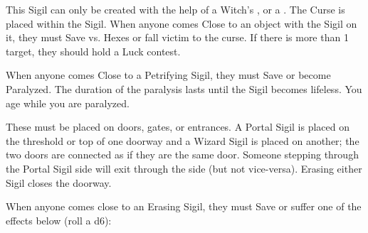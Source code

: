 {

\mybold{\COST 10\AU}



This Sigil can only be created with the help of a Witch's , or a .  The Curse is placed within the Sigil.  When anyone comes Close to an object with the Sigil on it, they must Save vs. Hexes or fall victim to the curse.  If there is more than 1 target, they should hold a Luck contest. 


When anyone comes Close to a Petrifying Sigil, they must Save or become Paralyzed.  The duration of the paralysis lasts until the Sigil becomes lifeless. You age while you are paralyzed.


These must be placed on doors, gates, or entrances.  A Portal Sigil is placed on the threshold or top of one doorway and a Wizard Sigil is placed on another; the two doors are connected as if they are the same door.  Someone stepping through the Portal Sigil side will exit through the  side (but not vice-versa).  Erasing either Sigil closes the doorway.


\mybold{\COST 100\AU}



When anyone comes close to an Erasing Sigil, they must Save or suffer one of the effects below (roll a d6):





}
